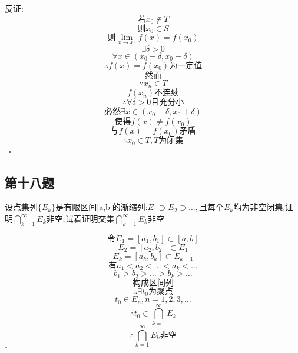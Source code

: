 \documentclass[a4paper]{article}
\begin{document}
    反证:
    \[\text{若}x_0\not\in T\]
    \[\text{则}x_0\in S\]
    \[\text{则}\lim_{x\to x_0}f(x)=f(x_0)\]
    \[\exists \delta > 0\]
    \[\forall x \in (x_0-\delta,x_0+\delta)\]
    \[\therefore f(x)=f(x_0)\text{为一定值}\]
    \[\text{然而}\]
    \[\because x_n \in T\]
    \[f(x_n)不连续\]
    \[\therefore \forall \delta >0\text{且充分小}\]
    \[\text{必然}\exists  x \in (x_0-\delta,x_0+\delta)\]
    \[\text{使得}f(x) \ne f(x_0)\]
    \[\text{与} f(x)=f(x_0) \text{矛盾}\]
    \[\therefore x_0 \in T , T \text{为闭集}\]\
    \hfill $\square$

    \subsection{第十八题}
    设点集列$\{E_k\}$是有限区间[a,b]的渐缩列:$E_1 \supset E_2 \supset \ldots,$且每个$E_k$均为非空闭集,证明$\bigcap_{k=1}^{\infty}E_k$非空,试着证明交集$ \bigcap_{k=1}^{\infty} E_k$非空

    \[\text{令}E_1=[a_1,b_1]\subset [a,b]\]
    \[E_2 =[a_2,b_2]\subset E_1\]
    \[E_k = [a_k,b_k]\subset E_{k-1}\]
    \[\text{有}a_1<a_2<\ldots<a_k<\ldots\]
    \[b_1>b_2>\ldots>b_k>\ldots\]
    \[\text{构成区间列}\]
    \[\therefore \exists t_0 \text{为聚点}\]
    \[t_0 \in E_n,n=1,2,3,\ldots\]
    \[\therefore t_0 \in \bigcap_{k=1}^{\infty}E_k\]
    \[\therefore \bigcap_{k=1}^{\infty}E_k\text{非空}\]
    \hfill $\square$
\end{document}
